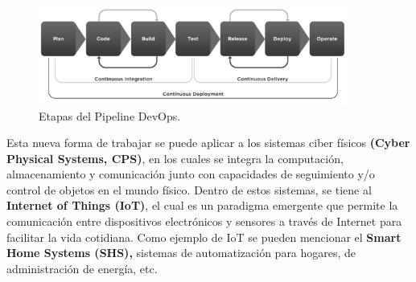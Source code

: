 \begin{figure}[H]
    \centering
    \includegraphics[width=0.9\textwidth]{fig/pipeline2.png}
    \caption{Etapas del Pipeline DevOps.}
    \label{fig:pipeline2}
\end{figure}

Esta nueva forma de trabajar se puede aplicar a los sistemas ciber físicos \textbf{(Cyber Physical Systems, CPS)}, en los cuales se integra la computación, almacenamiento y comunicación junto con capacidades de seguimiento y/o control de objetos en el mundo físico.
Dentro de estos sistemas, se tiene al \textbf{Internet of Things (IoT)}, el cual es un paradigma emergente que permite la comunicación entre dispositivos electrónicos y sensores a través de Internet para facilitar la vida cotidiana. Como ejemplo de IoT se pueden mencionar el \textbf{Smart Home Systems (SHS),} sistemas de automatización para hogares, de administración de energía, etc.

